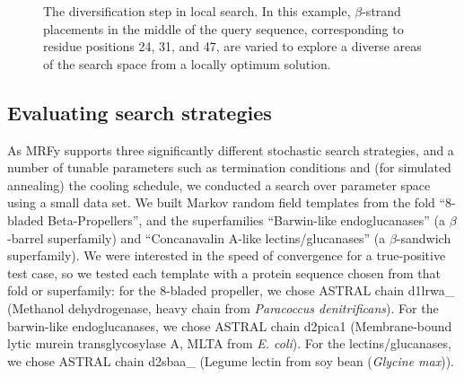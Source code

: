 \documentclass{acm_proc_article-sp}
\begin{document}
\begin{figure}[htb!]
\begin{center}
   \caption[The diversification step in local search.]
   {The diversification step in local search.
   In this example, $\beta$-strand placements in the middle of the query
   sequence, corresponding to residue positions 24, 31, and 47, are varied
   to explore a diverse areas of the search space from a locally optimum 
   solution.}
   \label{diversification}
 \end{center}
\end{figure}

% 
% 
% 


\subsection{Evaluating search strategies}\label{searchstrats}

As MRFy supports three significantly different stochastic search strategies, and
a number of tunable parameters such as termination conditions and (for 
simulated annealing) the cooling schedule, we conducted a search over parameter
space using a small data set.
We built Markov random field templates from the fold ``8-bladed Beta-Propellers'', and the superfamilies ``Barwin-like endoglucanases'' (a 
$\beta$-barrel superfamily) and ``Concanavalin A-like lectins/glucanases'' (a 
$\beta$-sandwich superfamily).
We were interested in the speed of convergence for a true-positive test case,
so we tested each template with a protein sequence chosen from that fold or
superfamily: for the 8-bladed propeller, we chose ASTRAL chain d1lrwa\_
(Methanol dehydrogenase, heavy chain from  \emph{Paracoccus denitrificans}).
For the barwin-like endoglucanases, we chose ASTRAL chain d2pica1 
(Membrane-bound lytic murein transglycosylase A, MLTA from \emph{E. coli}).
For the lectins/glucanases, we chose ASTRAL chain d2sbaa\_ 
(Legume lectin from soy bean (\emph{Glycine max})).
\end{document}
